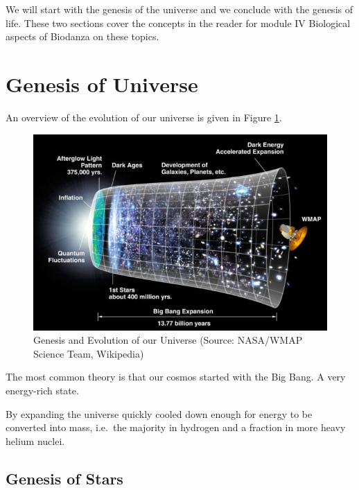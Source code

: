 \documentclass[
  11pt,
]{book}
\begin{document}
We will start with the genesis of the universe and we conclude with the genesis of life. These two sections cover the concepts in the reader for module IV Biological aspects of Biodanza on these topics.

\hypertarget{genesis-of-universe}{%
\section{Genesis of Universe}\label{genesis-of-universe}}

An overview of the evolution of our universe is given in Figure \ref{fig:evolutionUniverse}.

\begin{figure}

{\centering \includegraphics[width=1\linewidth]{./figs/originKosmos} 

}

\caption{Genesis and Evolution of our Universe (Source: NASA/WMAP Science Team, Wikipedia)}\label{fig:evolutionUniverse}
\end{figure}

The most common theory is that our cosmos started with the Big Bang.
A very energy-rich state.

By expanding the universe quickly cooled down enough for energy to be converted into mass, i.e.~the majority in hydrogen and a fraction in more heavy helium nuclei.

\hypertarget{genesis-of-stars}{%
\subsection{Genesis of Stars}\label{genesis-of-stars}}
\end{document}
